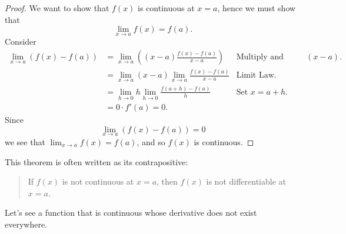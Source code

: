 \begin{proof}
We want to show that $f(x)$ is continuous at $x=a$, hence we must show that 
\[
\lim_{x\to a} f(x) = f(a).
\]
Consider
\begin{align*}
\lim_{x\to a} \left(f(x) - f(a)\right) &= \lim_{x\to a} \left((x-a)\frac{f(x) - f(a)}{x-a}\right) &\text{Multiply and divide by $(x-a)$.} \\
&= \lim_{x\to a} (x-a) \lim_{x\to a}\frac{f(x) - f(a)}{x-a} &\text{Limit Law.} \\
&= \lim_{h\to 0} h \lim_{h\to 0}\frac{f(a+h) - f(a)}{h} &\text{Set $x = a+h$.} \\
&= 0\cdot f'(a) = 0.
\end{align*}
Since 
\[
\lim_{x\to a}\left(f(x) - f(a)\right) = 0 
\]
we see that $\lim_{x\to a} f(x) = f(a)$, and so $f(x)$ is continuous.
\end{proof}

This theorem is often written as its contrapositive:
\begin{quote}
If $f(x)$ is not continuous at $x=a$, then $f(x)$ is not
differentiable at $x=a$.
\end{quote}


Let's see a function that is continuous whose derivative does not
exist everywhere.


